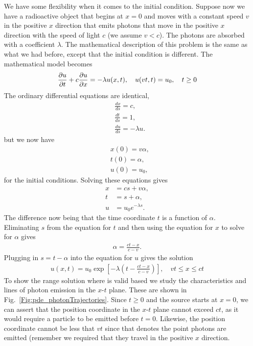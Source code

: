 We have some flexibility when it comes to the initial condition. Suppose now we have a radioactive object that begins at $x = 0$ and moves with a constant speed $v$ in the positive $x$ direction that emits photons that move in the positive $x$ direction with the speed of light $c$ (we assume $v < c$). The photons are absorbed with a coefficient $\lambda$. The mathematical description of this problem is the same as what we had before, except that the initial condition is different. The mathematical model becomes
\begin{align}
  \frac{ \partial {u} }{ \partial {t} } + c \frac{ \partial {u} }{ \partial {x} } = -\lambda u(x,t), \quad u(vt,t) = u_0, \quad t \ge 0
\end{align}
The ordinary differential equations are identical, 
\begin{subequations}
\begin{align}
  &\frac{dx}{ds} = c, \\
  &\frac{dt}{ds} = 1, \\
  &\frac{du}{ds} = -\lambda u .
\end{align}
\end{subequations}
but we now have
\begin{subequations}
\begin{align}
  &x(0) = v \alpha, \\
  &t(0) = \alpha, \\
  &u(0) = u_0,
\end{align}
\end{subequations}
for the initial conditions. Solving these equations gives
\begin{subequations}
\begin{align}
  x &= c s + v \alpha, \\
  t &= s + \alpha, \\
  u &= u_0 e^{-\lambda s } .
\end{align}
\end{subequations}
The difference now being that the time coordinate $t$ is a function of $\alpha$. Eliminating $s$ from the equation for $t$ and then using the equation for $x$ to solve for $\alpha$ gives
\begin{align}
  \alpha = \frac{ ct - x }{ c - v } .
\end{align}
Plugging in $s = t - \alpha$ into the equation for $u$ gives the solution
\begin{align}
  u(x,t) = u_0 \exp \left[ -\lambda \left( t - \frac{ c t - x }{ c - v } \right) \right] , \quad vt \le x \le ct
\end{align}
To show the range solution where is valid based we study the characteristics and lines of photon emission in the $x$-$t$ plane. These are shown in Fig.~\ref{Fig:pde_photonTrajectories}. Since $t \ge 0$ and the source starts at $x = 0$, we can assert that the position coordinate in the $x$-$t$ plane cannot exceed $ct$, as it would require a particle to be emitted before $t = 0$. Likewise, the position coordinate cannot be less that $vt$ since that denotes the point photons are emitted (remember we required that they travel in the positive $x$ direction.

